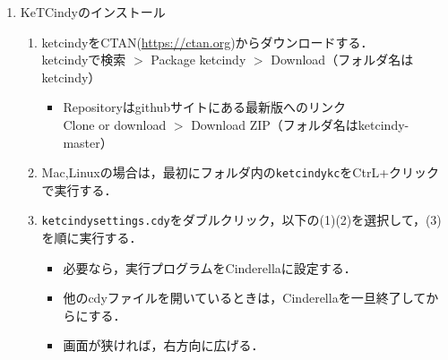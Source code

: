 \documentclass{ujarticle}
\begin{document}
\begin{enumerate}[\bf\large 1.]
\begin{enumerate}[(1)]
\end{enumerate}
 
\item KeTCindyのインストール\vspace{-2mm}
  \begin{enumerate}[(1)]
  \item ketcindyをCTAN(\url{https://ctan.org})からダウンロードする．\\
  \hspace*{10mm}ketcindyで検索 $>$ Package ketcindy $>$ Download（フォルダ名はketcindy）
    \begin{itemize}
    \item Repositoryはgithubサイトにある最新版へのリンク\\
        \hspace*{10mm}Clone or download $>$ Download ZIP（フォルダ名はketcindy-master）          
     \end{itemize}
  \item Mac,Linuxの場合は，最初にフォルダ内の\verb|ketcindykc|をCtrL+クリックで実行する．
  \item \verb|ketcindysettings.cdy|をダブルクリック，以下の(1)(2)を選択して，(3)を順に実行する．
    \begin{itemize}
    \item 必要なら，実行プログラムをCinderellaに設定する．
    \item 他のcdyファイルを開いているときは，Cinderellaを一旦終了してからにする．
   \item 画面が狭ければ，右方向に広げる．
   \end{itemize}

\vspace{3mm}


\end{enumerate}
\end{enumerate}
\end{document}
